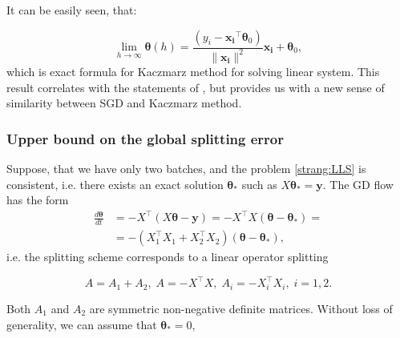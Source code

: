 \documentclass{article}
\newcommand{\vect}[1]{\boldsymbol{\mathbf{#1}}}
\begin{document}
It can be easily seen, that:

\begin{equation}
\label{strang:splitting_limit_kaczmarz}
\lim_{h \to \infty} \vect{\theta}(h) = \frac{\left(y_i - \vect{x_i}^\top\vect{\theta}_0 \right)}{\|\vect{x_i}\|^2} \vect{x_i} + \vect{\theta}_0,
\end{equation}
which is exact formula for Kaczmarz method for solving linear system. This result correlates with the statements of \cite{needell2014stochastic}, but provides us with a new sense of similarity between SGD and Kaczmarz method.

\subsubsection{Upper bound on the global splitting error}

Suppose, that we have only two batches, and the problem \eqref{strang:LLS} is consistent, i.e. there exists an exact solution $\vect{\theta}_*$ such as $X \vect{\theta}_* = \vect{y}$. The GD flow has the form
\begin{equation}\label{strang:model1}
\begin{split}
    \frac{d \vect{\theta}}{d t} &= -X^{\top} (X \vect{\theta} - \vect{y}) = -X^{\top} X(\vect{\theta} - \vect{\theta}_*) =\\ &= -(X_1^{\top} X_1 + X^{\top}_2 X_2)(\vect{\theta} - \vect{\theta}_*),
\end{split}
\end{equation}
i.e. the splitting scheme corresponds to a linear operator splitting

\begin{equation*}
A = A_1 + A_2, \; A = -X^{\top} X, \; A_i = -X^{\top}_i X_i, \; i = 1, 2.
\end{equation*}

Both $A_1$ and $A_2$ are symmetric non-negative definite matrices. Without loss of generality, we can assume that $\vect{\theta}_* = 0$,
\end{document}
